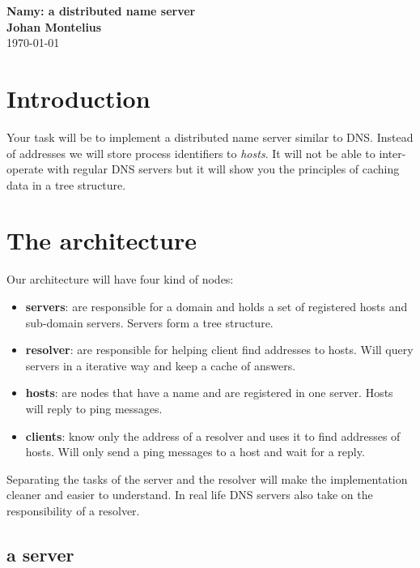 \documentclass[a4paper, 11pt]{article}
\newcommand{\nnsection}[1]{
\section*{#1}
\addcontentsline{toc}{section}{#1}
}
\begin{document}
\begin{center}
\vspace{20pt}
\textbf{\large Namy: a distributed name server}\\
\vspace{10pt}
\textbf{Johan Montelius}\\
\vspace{10pt}
\today{}
\end{center}

\nnsection{Introduction}

Your task will be to implement a distributed name server similar to
DNS. Instead of addresses we will store process identifiers to {\em
hosts}. It will not be able to inter-operate with regular DNS servers
but it will show you the principles of caching data in a tree
structure.

\section{The architecture}

Our architecture will have four kind of nodes:
\begin{itemize}
\item {\bf servers}: are responsible for a domain and holds a set of
registered hosts and sub-domain servers. Servers form a tree structure.

\item{\bf resolver}: are responsible for helping client find addresses
to hosts. Will query servers in a iterative way and keep a cache of
answers.

\item {\bf hosts}: are nodes that have a name and are registered in one
server. Hosts will reply to ping messages.

\item {\bf clients}: know only the address of a resolver and uses it
to find addresses of hosts. Will only send a ping messages to a
host and wait for a reply.

\end{itemize}

Separating the tasks of the server and the resolver will make the
implementation cleaner and easier to understand. In real life DNS
servers also take on the responsibility of a resolver. 


\subsection{a server}
\end{document}
